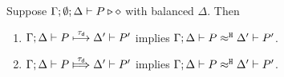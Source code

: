 \begin{proposition}
	\label{app:lem:tau_inert}
	Suppose $\Gamma; \emptyset; \Delta \vdash P \triangleright \diamond$  with balanced $\Delta$.
	Then
	\begin{enumerate}[1.]
		\item	$\Gamma; \Delta \vdash P \stackrel{\tau_{\mathsf{d}}}{\longmapsto} \Delta' \vdash P'$ implies
			$\Gamma; \Delta \vdash P \approx^\mathtt{H} \Delta' \vdash P'$.
		\item	$\horel{\Gamma}{\Delta}{P}{\Hby{\dtau}}{\Delta'}{P'}$ implies
			$\Gamma; \Delta \vdash P \approx^\mathtt{H} \Delta' \vdash P'$.
	\end{enumerate}
\end{proposition}


